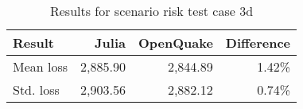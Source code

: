 \begin{table}[htbp]

\centering
\begin{tabular}{ l r r r }

\hline
\rowcolor{anti-flashwhite}
\bf{Result} & \bf{Julia} & \bf{OpenQuake} & \bf{Difference}\\
\hline
Mean loss & 2,885.90 & 2,844.89 & 1.42\% \\
Std. loss & 2,903.56 & 2,882.12 & 0.74\% \\
\hline
\end{tabular}

\caption{Results for scenario risk test case 3d}
\label{tab:result-sr-3d}
\end{table}
